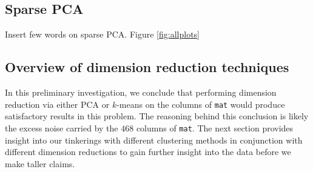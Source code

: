 \subsection{Sparse PCA}

Insert few words on sparse PCA. Figure \ref{fig:allplots}

\subsection{Overview of dimension reduction techniques}

In this preliminary investigation, we conclude that performing dimension reduction via either PCA or $k$-means on the columns of \verb|mat| would produce satisfactory results in this problem. The reasoning behind this conclusion is likely the excess noise carried by the $468$ columns of \verb|mat|. The next section provides insight into our tinkerings with different clustering methods in conjunction with different dimension reductions to gain further insight into the data before we make taller claims.
